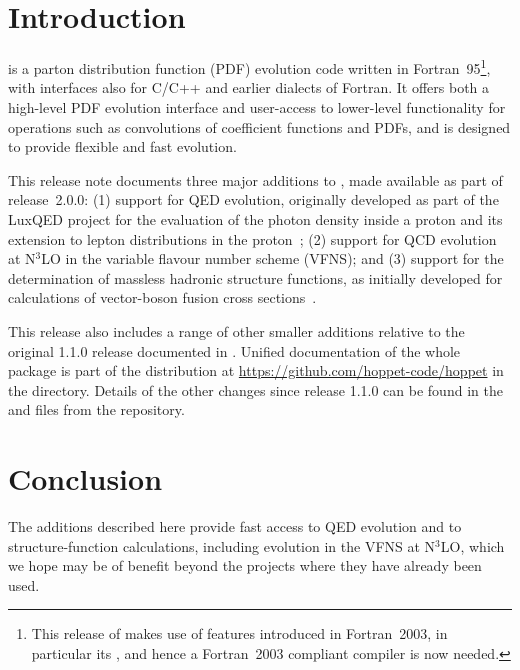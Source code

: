 \documentclass[preprint,1p,a4paper,11pt]{elsarticle}
\newcommand{\repolink}[2]{\href{https://github.com/hoppet-code/hoppet/blob/master/#1}{\ttt{#2}}}
\newcommand{\masterlink}[1]{\repolink{#1}{#1}}
\begin{document}
\section{Introduction}

\hoppet is a parton distribution function (PDF) evolution code written
in Fortran~95\footnote{This release of \hoppet makes use of features
introduced in Fortran~2003, in particular its , and hence a Fortran~2003 compliant compiler is now needed.},
with interfaces also for C/C++ and earlier dialects of Fortran.
%
It offers both a high-level PDF evolution interface and user-access to
lower-level functionality for operations such as convolutions of
coefficient functions and PDFs, and is designed to provide flexible and
fast evolution.

This release note documents three major additions to \hoppet, made
available as part of release~2.0.0: (1) support for QED evolution,
originally developed as part of the LuxQED project for the evaluation
of the photon density inside a proton and its extension to lepton
distributions in the
proton~\cite{Manohar:2016nzj,Manohar:2017eqh,Buonocore:2020nai,Buonocore:2021bsf};
%
(2) support for QCD evolution at N$^3$LO in the variable flavour number scheme (VFNS);
%
and (3) support for the
determination of massless hadronic structure functions, as initially developed
for calculations of vector-boson fusion cross
sections~\cite{Cacciari:2015jma,Dreyer:2016oyx,Dreyer:2018qbw,Dreyer:2018rfu}.

This release also includes a range of other smaller additions relative
to the original 1.1.0 release documented in
\cite{Salam:2008qg}.
%
Unified documentation of the whole \hoppet package is part of the
distribution at \url{https://github.com/hoppet-code/hoppet} in the
\masterlink{doc/} directory.
%
Details of the other changes since release 1.1.0 can be found in the
\masterlink{NEWS} and \masterlink{ChangeLog} files from the
repository.





\section{Conclusion}

The \hoppet additions described here provide fast access to QED
evolution and to structure-function calculations, including evolution
in the VFNS at N$^3$LO, which we hope may be of benefit beyond the
projects where they have already been used.
\end{document}
